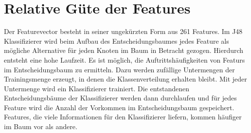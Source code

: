 \section{Relative Güte der Features}
Der Featurevector besteht in seiner ungekürzten Form aus 261 Features. Im J48 Klassifizierer wird beim Aufbau des Entscheidungsbaumes jedes Feature als mögliche Alternative für jeden Knoten im Baum in Betracht gezogen. Hierdurch entsteht eine hohe Laufzeit. Es ist möglich, die Auftrittshäufigkeiten von Featurs im Entscheidungsbaum zu ermitteln. Dazu werden zufällige Untermengen der Trainingsmenge erzeugt, in denen die Klassenverteilung erhalten bleibt. Mit jeder Untermenge wird ein Klassifizierer trainiert. Die entstandenen Entscheidungsbäume der Klassifizierer werden dann durchlaufen und für jedes Feature wird die Anzahl der Vorkommen im Entscheidungsbaum gespeichert. Features, die viele Informationen für den Klassifizierer liefern, kommen häufiger im Baum vor als andere.